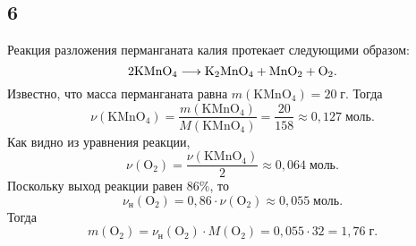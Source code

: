 \subsection{6}

Реакция разложения перманганата калия протекает следующими образом:
\[
\rm 2KMnO_4\longrightarrow K_2MnO_4+MnO_2+O_2.
\]
Известно, что масса перманганата равна $m(\mathrm{KMnO_4})=20\;\text{г}$. Тогда
\[
\nu(\mathrm{KMnO_4})=\frac{m(\mathrm{KMnO_4})}{M(\mathrm{KMnO_4})}=\frac{20}{158}\approx0{,}127\;\text{моль}.
\]
Как видно из уравнения реакции,
\[
\nu(\mathrm{O_2})=\frac{\nu(\mathrm{KMnO_4})}{2}\approx0{,}064\;\text{моль}.
\]
Поскольку выход реакции равен $86\%$, то
\[
\nu_\text{н}(\mathrm{O_2})=0{,}86\cdot\nu(\mathrm{O_2})\approx0{,}055\;\text{моль}.
\]
Тогда
\[
m(\mathrm{O_2})=\nu_\text{н}(\mathrm{O_2})\cdot M(\mathrm{O_2})=0{,}055\cdot32=1{,}76\;\text{г}.
\]
